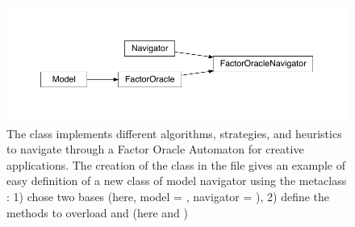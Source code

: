 \documentclass[letterpaper,10pt,english]{sphinxmanual}
\begin{document}
\begin{figure}[htbp]
\centering
\capstart

\includegraphics{inheritance-8880bdc449e3d4349093afc4177dfb2922cdb418.pdf}
\caption{The class {\hyperref[\detokenize{index:ModelNavigator.FactorOracleNavigator}]{}} implements different algorithms, strategies, and heuristics to navigate through a Factor Oracle Automaton for creative applications. The creation of the class {\hyperref[\detokenize{index:ModelNavigator.FactorOracleNavigator}]{}} in the file  gives an example of easy definition of a new class of model navigator using the metaclass {\hyperref[\detokenize{index:MetaModelNavigator.MetaModelNavigator}]{}}: 1) chose two bases (here, model = {\hyperref[\detokenize{index:Model.FactorOracle}]{}}, navigator = {\hyperref[\detokenize{index:Navigator.Navigator}]{}}), 2) define the methods to overload {\hyperref[\detokenize{index:Navigator.Navigator.simply_guided_generation}]{}} and {\hyperref[\detokenize{index:Navigator.Navigator.free_generation}]{}} (here {\hyperref[\detokenize{index:ModelNavigator.FactorOracleNavigator.simply_guided_navigation}]{}} and {\hyperref[\detokenize{index:ModelNavigator.FactorOracleNavigator.free_navigation}]{}})}\label{\detokenize{index:id4}}\end{figure}
\end{document}
